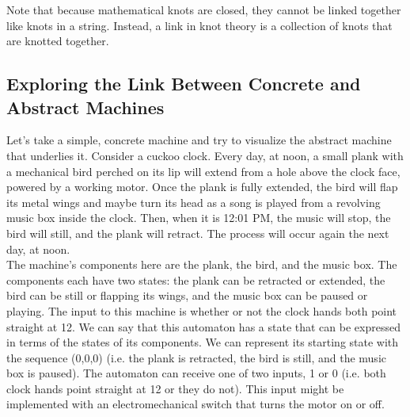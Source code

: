 Note that because mathematical knots are closed, they cannot be linked together like knots in a string. Instead, a link in knot theory is a collection of knots that are knotted together. \\






\subsection{Exploring the Link Between Concrete and Abstract Machines}

Let's take a simple, concrete machine and try to visualize the abstract machine that underlies it. Consider a cuckoo clock. Every day, at noon, a small plank with a mechanical bird perched on its lip will extend from a hole above the clock face, powered by a working motor. Once the plank is fully extended, the bird will flap its metal wings and maybe turn its head as a song is played from a revolving music box inside the clock. Then, when it is 12:01 PM, the music will stop, the bird will still, and the plank will retract. The process will occur again the next day, at noon. \\

The machine's components here are the plank, the bird, and the music box. The components each have two states: the plank can be retracted or extended, the bird can be still or flapping its wings, and the music box can be paused or playing. The input to this machine is whether or not the clock hands both point straight at 12. We can say that this automaton has a state that can be expressed in terms of the states of its components. We can represent its starting state with the sequence (0,0,0) (i.e. the plank is retracted, the bird is still, and the music box is paused). The automaton can receive one of two inputs, 1 or 0 (i.e. both clock hands point straight at 12 or they do not). This input might be implemented with an electromechanical switch that turns the motor on or off.

